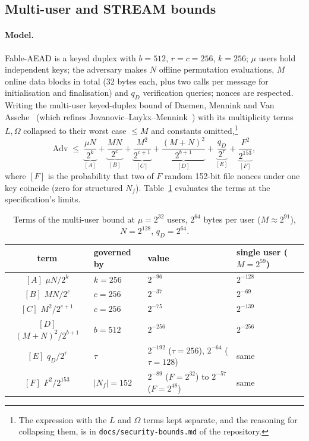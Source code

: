 \documentclass{iacrtrans}
\newcommand{\FableAEAD}{\textsf{Fable-AEAD}\xspace}
\begin{document}
\subsection{Multi-user and STREAM bounds}
\label{sec:mu}
\paragraph{Model.} \FableAEAD is a keyed duplex with $b = 512$, $r = c = 256$, $k = 256$; $\mu$ users hold independent keys; the adversary makes $N$ offline permutation evaluations, $M$ online data blocks in total (32 bytes each, plus two calls per message for initialisation and finalisation) and $q_D$ verification queries; nonces are respected. Writing the multi-user keyed-duplex bound of Daemen, Mennink and Van Assche~\cite{DMV17} (which refines Jovanovic--Luykx--Mennink~\cite{JLM14}) with its multiplicity terms $L, \Omega$ collapsed to their worst case $\leq M$ and constants omitted,\footnote{The expression with the $L$ and $\Omega$ terms kept separate, and the reasoning for collapsing them, is in \texttt{docs/security-bounds.md} of the repository.}
\[
\mathrm{Adv} \;\leq\; \underbrace{\frac{\mu N}{2^{k}}}_{[A]} + \underbrace{\frac{M N}{2^{c}}}_{[B]} + \underbrace{\frac{M^2}{2^{c+1}}}_{[C]} + \underbrace{\frac{(M+N)^2}{2^{b+1}}}_{[D]} + \underbrace{\frac{q_D}{2^{\tau}}}_{[E]} + \underbrace{\frac{F^2}{2^{153}}}_{[F]},
\]
where $[F]$ is the probability that two of $F$ random 152-bit file nonces under one key coincide (zero for structured $N_f$). Table~\ref{tab:mu} evaluates the terms at the specification's limits.

\begin{table}[htb]
\centering
\caption{Terms of the multi-user bound at $\mu = 2^{32}$ users, $2^{64}$ bytes per user ($M \approx 2^{91}$), $N = 2^{128}$, $q_D = 2^{64}$.}
\label{tab:mu}
\small
\begin{tabular}{clll}
\toprule
term & governed by & value & single user ($M = 2^{59}$)\\
\midrule
$[A]$ $\mu N/2^k$ & $k = 256$ & $2^{-96}$ & $2^{-128}$\\
$[B]$ $MN/2^c$ & $c = 256$ & $2^{-37}$ & $2^{-69}$\\
$[C]$ $M^2/2^{c+1}$ & $c = 256$ & $2^{-75}$ & $2^{-139}$\\
$[D]$ $(M+N)^2/2^{b+1}$ & $b = 512$ & $2^{-256}$ & $2^{-256}$\\
$[E]$ $q_D/2^\tau$ & $\tau$ & $2^{-192}$ ($\tau{=}256$), $2^{-64}$ ($\tau{=}128$) & same\\
$[F]$ $F^2/2^{153}$ & $|N_f| = 152$ & $2^{-89}$ ($F{=}2^{32}$) to $2^{-57}$ ($F{=}2^{48}$) & same\\
\bottomrule
\end{tabular}
\end{table}
\end{document}

